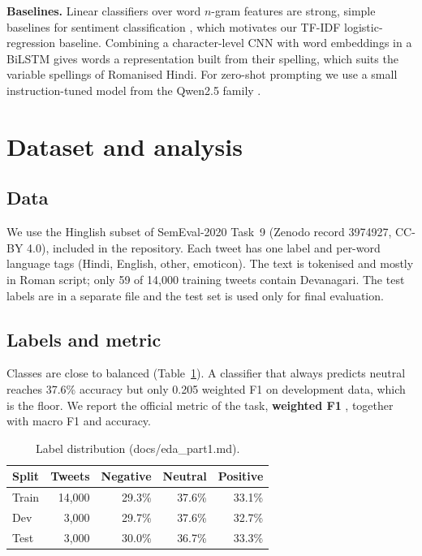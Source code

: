\documentclass{nle}
\begin{document}
\textbf{Baselines.} Linear classifiers over word $n$-gram features are strong, simple baselines for sentiment
classification \cite{wang2012}, which motivates our TF-IDF logistic-regression baseline. Combining a character-level CNN
with word embeddings in a BiLSTM \cite{ma2016} gives words a representation built from their spelling, which suits the
variable spellings of Romanised Hindi. For zero-shot prompting we use a small instruction-tuned model from the Qwen2.5
family \cite{qwen2024}.

\section{Dataset and analysis}
\subsection{Data}
We use the Hinglish subset of SemEval-2020 Task~9 \cite{patwa2020} (Zenodo record 3974927, CC-BY 4.0), included in the
repository. Each tweet has one label and per-word language tags (Hindi, English, other, emoticon). The text is tokenised
and mostly in Roman script; only 59 of 14{,}000 training tweets contain Devanagari. The test labels are in a separate
file and the test set is used only for final evaluation.

\subsection{Labels and metric}
Classes are close to balanced (Table~\ref{tab:labels}). A classifier that always predicts neutral reaches 37.6\%
accuracy but only 0.205 weighted F1 on development data, which is the floor. We report the official metric of the
task, \textbf{weighted F1} \cite{patwa2020}, together with macro F1 and accuracy.

\begin{table}
\centering
\caption{Label distribution (docs/eda\_part1.md).}
\label{tab:labels}
\begin{tabular}{lrrrr}
\hline\hline
Split & Tweets & Negative & Neutral & Positive \\
\hline
Train & 14{,}000 & 29.3\% & 37.6\% & 33.1\% \\
Dev   & 3{,}000  & 29.7\% & 37.6\% & 32.7\% \\
Test  & 3{,}000  & 30.0\% & 36.7\% & 33.3\% \\
\hline\hline
\end{tabular}
\end{table}
\end{document}
